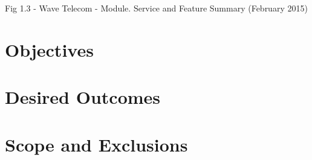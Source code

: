 \documentclass[letterpaper,10pt,openany,oneside,english]{sphinxmanual}
\begin{document}
Fig 1.3 - Wave Telecom - Module. Service and Feature Summary (February 2015)

\noindent{}


\section{}
\label{\detokenize{overview:aims}}

\section{Objectives}
\label{\detokenize{overview:objectives}}

\subsection{}
\label{\detokenize{overview:summaries}}

\subsection{}
\label{\detokenize{overview:breakdown}}
\noindent{}

\noindent{}

\noindent{}

\noindent{}

\noindent{}

\noindent{}

\noindent{}

\noindent{}

\noindent{}

\noindent{}

\noindent{}


\section{Desired Outcomes}
\label{\detokenize{overview:desired-outcomes}}

\section{Scope and Exclusions}
\label{\detokenize{overview:scope-and-exclusions}}
\noindent{}
\end{document}
